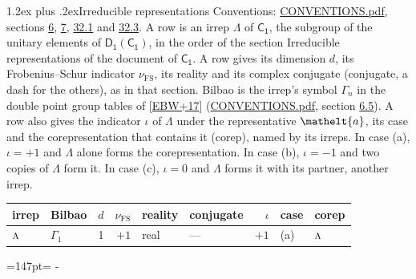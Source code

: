 \documentclass[10pt,a4paper]{article}
\makeatletter
\renewcommand\section{\@startsection{section}{1}{\z@}{-3ex plus -1ex minus -.2ex}%
  {1.2ex plus .2ex}{\normalfont\large\sffamily\bfseries\color{parttitle}}}
\newcommand{\needspace}[1]{\par\penalty-100\begingroup\dimen0=#1\relax\dimen2=\pagegoal
  \advance\dimen2-\pagetotal\ifdim\dimen0>\dimen2\relax\ifdim\dimen2>0pt\vfil\break\fi\fi
  \endgroup}
\numberwithin{equation}{section}
\newcommand{\eltfont}[1]{{\let\sigma\eltsigma\mathelt{#1}}}
\newcommand{\grp}[1]{\mathsf{#1}}
\newcommand{\irr}[1]{\text{\normalfont\scshape #1}}
\newcommand{\elt}[1]{\eltfont{#1}}
\newcommand{\fsind}{\nu_{\mathrm{FS}}}
\makeatother
\begin{document}
\section{Irreducible representations}\label{s:irreps}
Conventions: \href{../../CONVENTIONS.pdf}{CONVENTIONS.pdf}, sections \href{../../../rotation/CONVENTIONS.pdf\#conv.6}{6}, \href{../../../rotation/CONVENTIONS.pdf\#conv.7}{7}, \href{../../CONVENTIONS.pdf\#conv.32.1}{32.1} and \href{../../CONVENTIONS.pdf\#conv.32.3}{32.3}.
\leavevmode\label{n:irrep.Delta}A row is an irrep $\Lambda$ of $\grp{C_{1}}$, the subgroup of the unitary elements of $\grp{D_{1}}(\grp{C_{1}})$, in the order of the section Irreducible representations of the document of \href{../../../rotation/data/pdf/C1.pdf}{$\grp{C_{1}}$}. \label{n:index.dimension}\label{n:index.frobenius}\label{n:head.irrep}\label{n:head.reality}\label{n:head.conjugate}A row gives its dimension $d$, its Frobenius--Schur indicator $\fsind$, its reality and its complex conjugate (conjugate, a dash for the others), as in that section. \label{n:head.bilbao}\label{n:irrep.alias.gamma}Bilbao is the irrep's symbol $\Gamma_n$ in the double point group tables of [\href{../../../REFERENCES.pdf\#ref.EBW+17}{EBW+17}] (\href{../../CONVENTIONS.pdf}{CONVENTIONS.pdf}, section \href{../../../rotation/CONVENTIONS.pdf\#conv.6.5}{6.5}). \label{n:head.case.corep}\label{n:head.corep}A row also gives the indicator $\iota$ of $\Lambda$ under the representative $\elt{a}$, its case and the corepresentation that contains it (corep), named by its irreps. In case (a), $\iota = +1$ and $\Lambda$ alone forms the corepresentation. In case (b), $\iota = -1$ and two copies of $\Lambda$ form it. In case (c), $\iota = 0$ and $\Lambda$ forms it with its partner, another irrep.
\setlength{\emergencystretch}{2em}\par\setlength{\emergencystretch}{0pt}
{\small\renewcommand{\arraystretch}{1.25}\setlength{\tabcolsep}{4pt}\begin{longtable}{@{}llrrllrll@{}}\toprule
irrep & Bilbao & $d$ & $\fsind$ & reality & conjugate & $\iota$ & case & corep\\\midrule\endhead
\bottomrule\endfoot\endlastfoot
$\irr{a}$ & $\Gamma_{1}$ & 1 & $+1$ & real & --- & $+1$ & (a) & $\irr{a}$\\
\bottomrule\end{longtable}}
\needspace{147pt}
\end{document}
